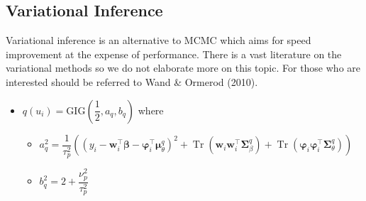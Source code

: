 \documentclass[12pt]{article}
\newcommand{\bs}{\boldsymbol}
\DeclareMathOperator{\Tr}{Tr}
\begin{document}
\subsection{Variational Inference}
  Variational inference is an alternative to MCMC which aims for speed improvement at the expense of performance. There is a vast literature on the variational methods so we do not elaborate more on this topic. For those who are interested should be referred to Wand \& Ormerod (2010).
\begin{itemize}
  \item $q\left(u_{i}\right) = \mathrm{GIG}\left(\dfrac{1}{2}, a_{q}, b_{q}\right)$ where
  \begin{itemize}
    \item $a_{q}^{2}= \dfrac{1}{\tau_{p}^{2}}\left(\left(y_{i}-\bs{w}_{i}^{\top}\bs{\beta}-\bs{\varphi}_{i}^{\top}\bs{\mu}_{\theta}^{q}\right)^{2}+\Tr\left(\bs{w}_{i}\bs{w}_{i}^{\top}\bs{\Sigma}_{\beta}^{q}\right)+\Tr\left(\bs{\varphi}_{i}\bs{\varphi}_{i}^{\top}\bs{\Sigma}_{\theta}^{q}\right) \right) $
    \item $b_{q}^{2}=2 + \dfrac{\nu_{p}^{2}}{\tau_{p}^{2}}$
  \end{itemize}
\end{itemize}
\end{document}
